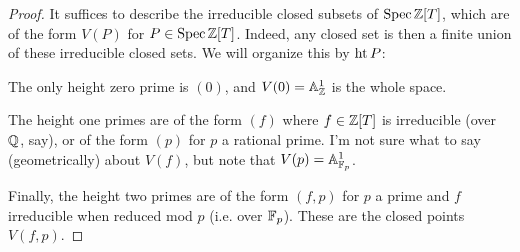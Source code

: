 \begin{proof}
	It suffices to describe the irreducible closed subsets of $\operatorname{Spec}\mathbb{Z}[T]$, which are of the form $V(P)$ for $P \in \operatorname{Spec}\mathbb{Z}[T]$. Indeed, any closed set is then a finite union of these irreducible closed sets. We will organize this by $\operatorname{ht} P$:
	
	The only height zero prime is $(0)$, and $V(0) = \mathbb{A}_{\mathbb{Z}}^1$ is the whole space.
	
	The height one primes are of the form $(f)$ where $f \in \mathbb{Z}[T]$ is irreducible (over $\mathbb{Q}$, say), or of the form $(p)$ for $p$ a rational prime. I'm not sure what to say (geometrically) about $V(f)$, but note that $V(p) = \mathbb{A}_{\mathbb{F}_p}^1$.
	
	Finally, the height two primes are of the form $(f,p)$ for $p$ a prime and $f$ irreducible when reduced mod $p$ (i.e. over $\mathbb{F}_p$). These are the closed points $V(f,p)$.
\end{proof}
